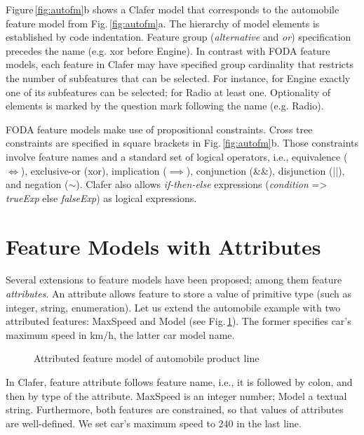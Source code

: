\documentclass{llncs}
\newcommand{\figref}[1]{Fig.\,\ref{fig:#1}}
\newcommand{\Figref}[1]{Figure\,\ref{fig:#1}}
\begin{document}
\Figref{autofm}b shows a Clafer model that corresponds to the automobile feature model from \figref{autofm}a. The hierarchy of model elements is established by code indentation. Feature group (\emph{alternative} and \emph{or}) specification precedes the name (e.g. \textsf{xor} before \textsf{Engine}). In contrast with FODA feature models, each feature in Clafer may have specified group cardinality that restricts the number of subfeatures that can be selected. For instance, for \textsf{Engine} exactly one of its subfeatures can be selected; for \textsf{Radio} at least one. Optionality of elements is marked by the question mark following the name (e.g. \textsf{Radio}).

FODA feature models make use of propositional constraints. Cross tree constraints are specified in square brackets in \figref{autofm}b. Those constraints involve feature names and a standard set of logical operators, i.e., equivalence ($\iff$), exclusive-or (\textsf{xor}), implication ($\implies$), conjunction (\textsf{\&\&}), disjunction (\textsf{||}), and negation (\textsf{$\sim$}). Clafer also allows \textit{if-then-else} expressions (\textit{condition} \textsf{=>} \textit{trueExp} \textsf{else} \textit{falseExp}) as logical expressions.

\section{Feature Models with Attributes}

Several extensions to feature models have been proposed; among them feature \emph{attributes}. An attribute allows feature to store a value of primitive type (such as integer, string, enumeration). Let us extend the automobile example with two attributed features: \textsf{MaxSpeed} and \textsf{Model} (see \figref{aautofm}). The former specifies car's maximum speed in km/h, the latter car model name.

\begin{figure}
  
  \caption{Attributed feature model of automobile product line\label{fig:aautofm}}
\end{figure}

In Clafer, feature attribute follows feature name, i.e., it is followed by colon, and then by type of the attribute. \textsf{MaxSpeed} is an integer number;  \textsf{Model} a textual string. Furthermore, both features are constrained, so that values of attributes are well-defined. We set car's maximum speed to 240 in the last line.
\end{document}
